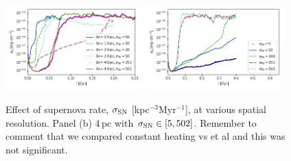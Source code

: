 \documentclass[iop,apj,numberedappendix,twocolappendix]{emulateapj}
\begin{document}
\begin{figure}
\centering
\includegraphics[trim=0.0cm 0.0cm 0.0cm 0.0cm,clip=true,width=0.47\textwidth]{csc_figs/sn_dx.png}
\includegraphics[trim=0.0cm 0.0cm 0.0cm 0.0cm,clip=true,width=0.47\textwidth]{csc_figs/sn4pc.png}
\caption{
Effect of supernova rate, $\sigma_{\rm SN}$ [kpc$^{-3}$Myr$^{-1}$], at various
spatial resolution. Panel (b) 4\,pc with $\sigma_{\rm SN} \in[5,502]$.
{Remember to comment that we compared constant heating vs \citet{Wolfire:1995} et al and this was not significant.}
\label{fig:brms_SNrate}
}
\end{figure}
\end{document}
